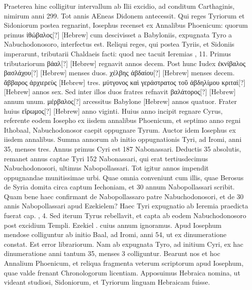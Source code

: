 Praeterea hinc colligitur intervallum
ab Ilii excidio, ad conditum Carthaginis, nimirum anni 299.
Tot annis AEneas Didonem antecessit.
Qui reges Tyriorum et Sidoniorum
postea regnarint, Iosephus recenset ex Annalibus Phoenicum:
quorum primus \textgreek{ἰθώβαλος[?]} \texthebrew{[Hebrew]}
 cum descivisset a Babyloniis,
expugnata Tyro a Nabuchodonosoro, interfectus est.
Reliqui reges, qui postea Tyriis, et Sidoniis imperarunt, tributarii
Chaldaeis facti: quod nec tacuit Ieremias , 11.
Primus tributariorum
\textgreek{βάαλ[?]} \texthebrew{[Hebrew]} regnavit annos decem.
Post hunc Iudex
\textgreek{ἐκνίβαλος βασλάχου[?]} \texthebrew{[Hebrew]} menses duos.
\textgreek{χέλβης ἀβδαίου[?]}
\texthebrew{[Hebrew]} menses decem.
\textgreek{ἄββαρος ἀρχιερεὺς} \texthebrew{[Hebrew]} tres.
\textgreek{μύτγονος
καὶ γεράστρατος τοῦ ἀβδηλίμου κριταὶ[?]} \texthebrew{[Hebrew]}
annos sex.
Sed inter illos duos fratres refnavit
 \textgreek{βαλάτορος[?]} \texthebrew{[Hebrew]}
annum unum.
\textgreek{μέρβαλος[?]} arcessitus Babylone
 \texthebrew{[Hebrew]} annos quatuor.
Frater huius \textgreek{εἴρωμος[?]} \texthebrew{[Hebrew]} anno viginti.
Huius anno 
incipit regnare Cyrus, referente eodem Iosepho ex iisdem annalibus
Phoenicum, et septimo anno regni Ithobaal, Nabuchodonosor
caepit oppugnare Tyrum.
Auctor idem Iosephus ex iisdem
annalibus.
Summa annorum ab initio oppugnationis Tyri, ad
 Iromi, anni 35, menses tres.
Annus primus Cyri est 187 Nabonassari.
Deductis 35 absolutis, remanet annus captae Tyri 152
Nabonassari, qui erat tertiusdecimus Nabuchodonosori, ultimus
Nabopollassari.
Tot igitur annos impendit oppugnandae munitissimae
urbi.
Quae omnia conveniunt cum illis, quae Berosus de Syria
domita circa captum Iechoniam, et 30 annum Nabopollassari scribit.
Quam bene haec confirmant de Nabopollassaro patre Nabuchodonosori,
et de 30 annis Nabopollassari apud Ezekielem?
Haec Tyri expugnatio ab Ieremia praedicta fuerat cap. , 4.
Sed iterum
Tyrus rebellavit, et capta ab eodem Nabuchodonosoro post
excidium Templi.
Ezekiel . cuius annum ignoramus.
Apud
Iosephum mendose colliguntur ab initio Baal, ad  Iromi, anni
54, ut ex dinumeratione constat.
Est error librariorum.
Nam ab expugnata
Tyro, ad initium Cyri, ex hac dinumeratione anni tantum
35, menses 3 colliguntur.
Bearunt nos et hoc Annalium Phoenicum,
et reliqua fragmenta veterum scriptorum apud Iosephum, quae valde
frenant Chronologorum licentiam.
Apposuimus Hebraica
nomina, ut videant studiosi, Sidoniorum, et Tyriorum linguam
Hebraicam fuisse.

